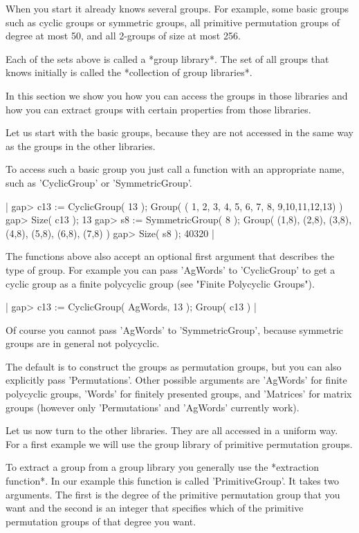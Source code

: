 
When you start {\GAP} it already knows several groups.  For example, some
basic  groups  such as cyclic  groups or symmetric groups, all  primitive
permutation groups of degree at most 50, and all 2-groups of size at most
256.

Each of the sets  above  is called a *group  library*.   The set  of  all
groups that  {\GAP} knows  initially is called  the  *collection of group
libraries*.

In  this  section we  show  you how you  can  access the groups in  those
libraries and how you can extract  groups with  certain  properties  from
those libraries.

Let us start with the basic  groups, because they are not accessed in the
same way as the groups in the other libraries.

To access such a basic group you just call a function with an appropriate
name, such as 'CyclicGroup' or 'SymmetricGroup'.

|    gap> c13 := CyclicGroup( 13 );
    Group( ( 1, 2, 3, 4, 5, 6, 7, 8, 9,10,11,12,13) )
    gap> Size( c13 );
    13
    gap> s8 := SymmetricGroup( 8 );
    Group( (1,8), (2,8), (3,8), (4,8), (5,8), (6,8), (7,8) )
    gap> Size( s8 );
    40320 |

The functions above also accept an optional first argument that describes
the type of group.   For example you can pass 'AgWords' to  'CyclicGroup'
to  get a  cyclic  group  as  a  finite  polycyclic  group  (see  "Finite
Polycyclic Groups").

|    gap> c13 := CyclicGroup( AgWords, 13 );
    Group( c13 ) |

Of  course  you   cannot  pass  'AgWords'  to  'SymmetricGroup',  because
symmetric groups are in general not polycyclic.

The default is to construct the groups as permutation groups, but you can
also  explicitly  pass  'Permutations'.   Other  possible  arguments  are
'AgWords' for finite polycyclic  groups, 'Words' for  finitely  presented
groups, and 'Matrices' for matrix groups (however only 'Permutations' and
'AgWords' currently work).

Let us now turn to the  other  libraries.   They  are all  accessed in  a
uniform  way.  For a  first example  we  will use  the  group library  of
primitive permutation groups.

To extract a group from a group library you generally use the *extraction
function*.  In  our example this function is called 'PrimitiveGroup'.  It
takes  two  arguments.   The  first  is  the  degree  of  the   primitive
permutation  group  that  you want  and  the second  is  an  integer that
specifies which of  the primitive permutation groups  of that  degree you
want.

